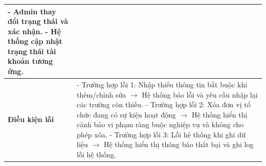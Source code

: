 \begin{longtable}{|p{}|p{}|}
- Admin thay đổi trạng thái và xác nhận. \newline
- Hệ thống cập nhật trạng thái tài khoản tương ứng. \\ \hline
\textbf{Điều kiện lỗi} &
- Trường hợp lỗi 1: Nhập thiếu thông tin bắt buộc khi thêm/chỉnh sửa $\rightarrow$ Hệ thống báo lỗi và yêu cầu nhập lại các trường còn thiếu. \newline
- Trường hợp lỗi 2: Xóa đơn vị tổ chức đang có sự kiện hoạt động $\rightarrow$ Hệ thống hiển thị cảnh báo vi phạm ràng buộc nghiệp vụ và không cho phép xóa. \newline
- Trường hợp lỗi 3: Lỗi hệ thống khi ghi dữ liệu $\rightarrow$ Hệ thống hiển thị thông báo thất bại và ghi log lỗi hệ thống. \\ \hline
\end{longtable}

